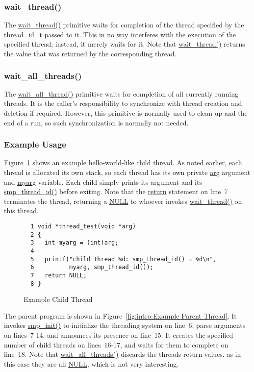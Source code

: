 \subsubsection{wait\_thread()}

The \url{wait_thread()} primitive waits for completion of the thread
specified by the \url{thread_id_t} passed to it.
This in no way interferes with the execution of the specified thread;
instead, it merely waits for it.
Note that \url{wait_thread()} returns the value that was returned by
the corresponding thread.

\subsubsection{wait\_all\_threads()}

The \url{wait_all_thread()}
primitive waits for completion of all currently running threads.
It is the caller's responsibility to synchronize with thread creation
and deletion if required.
However, this primitive is normally used to clean up and the end of
a run, so such synchronization is normally not needed.

\subsubsection{Example Usage}

Figure~\ref{fig:intro:Example Child Thread}
shows an example hello-world-like child thread.
As noted earlier, each thread is allocated its own stack, so
each thread has its own private \url{arg} argument and \url{myarg} variable.
Each child simply prints its argument and its \url{smp_thread_id()}
before exiting.
Note that the \url{return} statement on line~7 terminates the thread,
returning a \url{NULL} to whoever invokes \url{wait_thread()} on this
thread.

\begin{figure}[htbp] 
{ \scriptsize
\begin{verbatim}
  1 void *thread_test(void *arg)
  2 {
  3   int myarg = (int)arg;
  4 
  5   printf("child thread %d: smp_thread_id() = %d\n",
  6          myarg, smp_thread_id());
  7   return NULL;
  8 }
\end{verbatim}
}
\caption{Example Child Thread}
\label{fig:intro:Example Child Thread}
\end{figure}

The parent program is shown in
Figure~\ref{fig:intro:Example Parent Thread}.
It invokes \url{smp_init()} to initialize the threading system on
line~6,
parse arguments on lines~7-14, and announces its presence on line~15.
It creates the specified number of child threads on lines~16-17,
and waits for them to complete on line~18.
Note that \url{wait_all_threads()} discards the threads return values,
as in this case they are all \url{NULL}, which is not very interesting.

